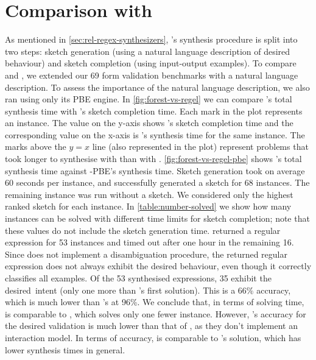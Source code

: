 \afterpage{\clearpage} %

\section{Comparison with \Regel}\label{sec:comp-regel}



As mentioned in \autoref{sec:rel-regex-synthesizers}, \Regel's synthesis procedure is split into two steps: sketch generation (using a natural language description of desired behaviour) and sketch completion (using input-output examples).
%
To compare \Regel and \Forest{}, we extended our 69 form validation benchmarks with a natural language description.
To assess the importance of the natural language description, we also ran \Regel using only its PBE engine. %
%
In \autoref{fig:forest-vs-regel} we can compare \Forest's total synthesis time with \Regel's sketch completion time. Each mark in the plot represents an instance. The value on the y-axis shows \Regel's sketch completion time and the corresponding value on the x-axis is \Forest's synthesis time for the same instance. The marks above the \(y = x\) line (also represented in the plot) represent problems that took longer to synthesise with \Regel than with \Forest.
\autoref{fig:forest-vs-regel-pbe} shows \Forest's total synthesis time against \Regel-PBE's synthesis time.
Sketch generation took on average 60 seconds per instance, and successfully generated a sketch for 68 instances. The remaining instance was run without a sketch.
We considered only the highest ranked sketch for each instance.
In \autoref{table:number-solved} we show how many instances can be solved with different time limits for sketch completion; note that these values do not include the sketch generation time.
%
\Regel{} returned a regular expression for 53 instances and timed out after one hour in the remaining 16.
Since \Regel does not implement a disambiguation procedure, the returned regular expression does not always exhibit the desired behaviour, even though it correctly classifies all examples.
Of the 53 synthesised expressions, 35 exhibit the desired~intent (only one more than \Forest's first solution).
This is a 66\% accuracy, which is much lower than \Forest's at 96\%. 
We conclude that, in terms of solving time, \Regel is comparable to \Forest, which solves only one fewer instance. However, \Regel's accuracy for the desired validation is much lower than that of \Forest, as they don't implement an interaction model. In terms of accuracy, \Regel is comparable to \Forest's  solution, which has lower synthesis times in general.

